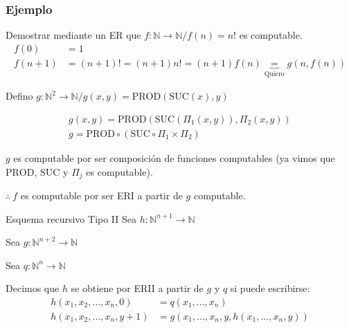 \subsubsection{Ejemplo}
Demostrar mediante un ER que $f: \mathbb{N} \to \mathbb{N}/f(n) = n!$ es
computable.
%
\begin{align*}
    f(0) &= 1 \\
    f(n+1) &= (n+1)! = (n+1) n! = (n+1) f(n) \underbrace{=}_{\text{Quiero}} 
    g(n, f(n))
\end{align*}

Defino $g: \mathbb{N}^2 \to \mathbb{N} / g(x,y) = 
\mathrm{PROD}(\mathrm{SUC}(x),y)$

\begin{align*}
    g(x,y) = \mathrm{PROD}(\mathrm{SUC}(\Pi_1 (x,y)), \Pi_2 (x,y)) \\
    g = \mathrm{PROD} \circ (\mathrm{SUC} \circ \Pi_1 \times \Pi_2)
\end{align*}

\smallskip

$g$ es computable por ser composición de funciones computables 
%
(ya vimos que $\mathrm{PROD}$, $\mathrm{SUC}$ y $\Pi_j$ es computable).

\begin{center}
    $\therefore ~ f$ es computable por ser ERI a partir de $g$ computable.
\end{center} 

\bigskip

%
\begin{definicion}{Esquema recursivo Tipo II}{}
    Sea $h: \mathbb{N}^{n+1} \to \mathbb{N}$
    
    Sea $g: \mathbb{N}^{n+2} \to \mathbb{N}$

    Sea $q: \mathbb{N}^{n} \to \mathbb{N}$

    \medskip

    Decimos que $h$ se obtiene por ERII a partir de $g$ y $q$ si puede 
    escribirse:
    \begin{align*}
        h(x_1, x_2, \dotsc, x_n, 0) &= q(x_1, \dotsc, x_n) \\
        h(x_1, x_2, \dotsc, x_n, y+1) &= g(x_1, \dotsc, x_n, y, 
        h(x_1,\dotsc, x_n, y))
    \end{align*}
\end{definicion}

